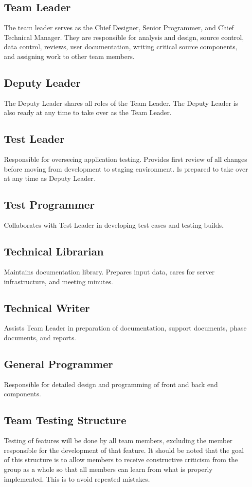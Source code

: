 \documentclass[]{article}
\begin{document}
\subsection{Team Leader}
The team leader serves as the Chief Designer, Senior Programmer, and Chief Technical Manager. They are responsible for analysis and design, source control, data control, reviews, user documentation, writing critical source components, and assigning work to other team members.
\subsection{Deputy Leader}
The Deputy Leader shares all roles of the Team Leader. The Deputy Leader is also ready at any time to take  over as the Team  Leader.
\subsection{Test Leader}
Responsible for overseeing application testing. Provides first review of all changes before moving from development to staging environment. Is prepared to take over at any time as Deputy Leader.
\subsection{Test Programmer}
Collaborates with Test Leader in developing test cases and testing builds.
\subsection{Technical Librarian}
Maintains documentation library. Prepares input data, cares for server infrastructure, and meeting minutes.
\subsection{Technical Writer}
Assists Team Leader in preparation of documentation, support documents, phase documents, and reports.
\subsection{General Programmer}
Responsible for detailed design and programming of front and back end components.

\subsection{Team Testing Structure}
Testing of features will be done by all team members, excluding the member responsible for the development of that feature. It should be noted that the goal of this structure is to allow members to receive constructive criticism from the group as a whole so that all members can learn from what is properly implemented. This is to avoid repeated mistakes.
\end{document}
